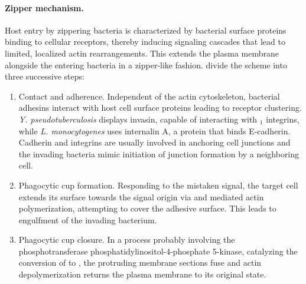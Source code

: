 \label{zipper-mechanism}

\paragraph{Zipper mechanism.}
Host entry by zippering bacteria is characterized by bacterial surface proteins binding to cellular receptors, thereby inducing signaling cascades that lead to limited, localized actin rearrangements. This extends the plasma membrane alongside the entering bacteria in a zipper-like fashion. \citeauthor{Cossart2004} divide the scheme into three successive steps:
\begin{enumerate}[label=(\alph*)]
  \item Contact and adherence. Independent of the actin cytoskeleton, bacterial adhesins interact with host cell surface proteins leading to receptor clustering. \textit{Y. pseudotuberculosis} displays invasin, capable of interacting with \textbeta$_1$ integrins, while \textit{L. monocytogenes} uses internalin A, a protein that binds E-cadherin. Cadherin and integrins are usually involved in anchoring cell junctions and the invading bacteria mimic initiation of junction formation by a neighboring cell.
  \item Phagocytic cup formation. Responding to the mistaken signal, the target cell extends its surface towards the signal origin via  and  mediated actin polymerization, attempting to cover the adhesive surface. This leads to engulfment of the invading bacterium. 
  \item Phagocytic cup closure. In a process probably involving the phosphotransferase phosphatidylinositol-4-phosphate 5-kinase, catalyzing the conversion of  to , the protruding membrane sections fuse and actin depolymerization returns the plasma membrane to its original state.
\end{enumerate}

\label{trigger-mechanism}

